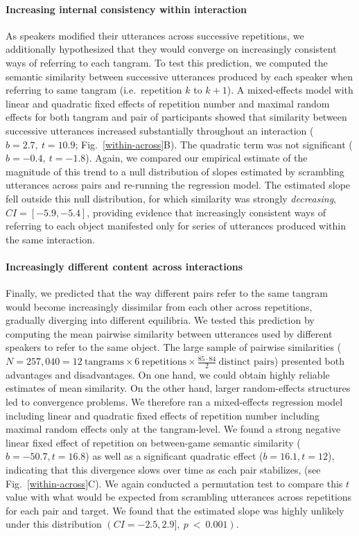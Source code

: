 \documentclass[alpha-refs]{wiley-article}
\begin{document}
\paragraph{Increasing internal consistency within interaction}

As speakers modified their utterances across successive repetitions, we additionally hypothesized that they would converge on increasingly consistent ways of referring to each tangram.
To test this prediction, we computed the semantic similarity between successive utterances produced by each speaker when referring to same tangram (i.e.~repetition $k$ to $k+1$). %
A mixed-effects model with linear and quadratic fixed effects of repetition number and maximal random effects for both tangram and pair of participants showed that similarity between successive utterances increased substantially throughout an interaction ($b = 2.7,~t = 10.9$; Fig.~\ref{within-across}B). 
The quadratic term was not significant ($b= -0.4,~t=-1.8$).
Again, we compared our empirical estimate of the magnitude of this trend to a null distribution of slopes estimated by scrambling utterances across pairs and re-running the regression model.%
The estimated slope fell outside this null distribution, for which similarity was strongly \emph{decreasing}, $CI = [-5.9, -5.4]$, providing evidence that increasingly consistent ways of referring to each object manifested only for series of utterances produced within the same interaction.

\paragraph{Increasingly different content across interactions}
Finally, we predicted that the way different pairs refer to the same tangram would become increasingly dissimilar from each other across repetitions, gradually diverging into different equilibria.
We tested this prediction by computing the mean pairwise similarity between utterances used by different speakers to refer to the same object.
The large sample of pairwise similarities ($N = 257,040 = 12~\textrm{tangrams} \times 6~\textrm{repetitions} \times \frac{85 \cdot 84}{2}~\textrm{distinct pairs}$) presented both advantages and disadvantages.
On one hand, we could obtain highly reliable estimates of mean similarity. 
On the other hand, larger random-effects structures led to convergence problems.
We therefore ran a mixed-effects regression model including linear and quadratic fixed effects of repetition number including maximal random effects only at the tangram-level. 
We found a strong negative linear fixed effect of repetition on between-game semantic similarity ($b = -50.7, t= 16.8$) as well as a significant quadratic effect ($b= 16.1, t = 12$), indicating that this divergence slows over time as each pair stabilizes, (see Fig.~\ref{within-across}C).
We again conducted a permutation test to compare this $t$ value with what would be expected from scrambling utterances across repetitions for each pair and target.
We found that the estimated slope was highly unlikely under this distribution $(CI = -2.5, 2.9],~p~<~0.001)$. 
\end{document}
